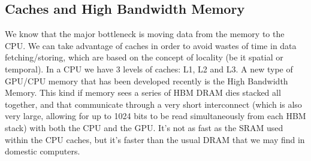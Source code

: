 \subsection{Caches and High Bandwidth Memory}

We know that the major bottleneck is moving data from the memory to the CPU. We can take advantage of caches in order to avoid wastes of time in data fetching/storing, which are based on the concept of locality (be it spatial or temporal). In a CPU we have 3 levels of caches: L1, L2 and L3.
\nwl
A new type of GPU/CPU memory that has been developed recently is the High Bandwidth Memory. This kind if memory sees a series of HBM DRAM dies stacked all together, and that communicate through a very short interconnect (which is also very large, allowing for up to 1024 bits to be read simultaneously from each HBM stack) with both the CPU and the GPU. It's not as fast as the SRAM used within the CPU caches, but it's faster than the usual DRAM that we may find in domestic computers.